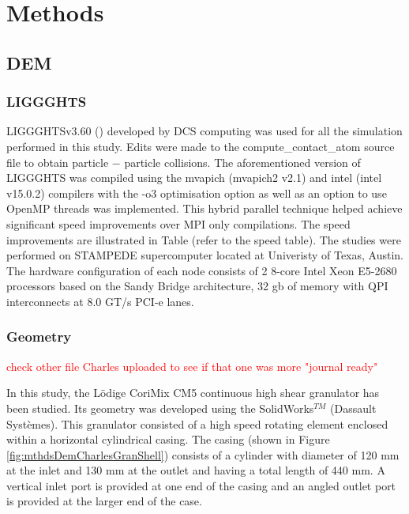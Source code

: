 \documentclass[preprint,11pt,authoryear]{elsarticle}
\begin{document}
	
	
	\section{Methods}
	
	  \subsection{DEM}
	    \subsubsection{LIGGGHTS}
	    	\par LIGGGHTSv3.60 (\cite{Kloss2012}) developed by DCS computing was used for all the simulation performed in this study. Edits were made to the compute\_contact\_atom source file to obtain particle $-$ particle collisions. The aforementioned version of LIGGGHTS was compiled using the mvapich (mvapich2 v2.1) and intel (intel v15.0.2) compilers with the -o3 optimisation option as well as an option to use OpenMP threads was implemented. This hybrid parallel technique helped achieve significant speed improvements over MPI only compilations. The speed improvements are illustrated in Table (refer to the speed table). The studies were performed on STAMPEDE supercomputer located at Univeristy of Texas, Austin. The hardware configuration of each node consists of 2 8-core Intel Xeon E5-2680 processors based on the Sandy Bridge architecture, 32 gb of memory with QPI interconnects at 8.0 GT/s PCI-e lanes.

	        
	    \subsubsection{Geometry}    
	    \par \textcolor{red}{check other file Charles uploaded to see if that one was more "journal ready"}
	    
	    \par In this study, the L\"{o}dige CoriMix CM5 continuous high shear granulator has been studied. Its geometry was developed using the SolidWorks$^{TM}$ (Dassault Syst\`{e}mes). This granulator consisted of a high speed rotating element enclosed within a horizontal cylindrical casing. The casing (shown in Figure \ref{fig:mthdsDemCharlesGranShell}) consists of a cylinder with diameter of 120 mm at the inlet and 130 mm at the outlet and having a total length of 440 mm. A vertical inlet port is provided at one end of the casing and an angled outlet port is provided at the larger end of the case. 
	
\end{document}
